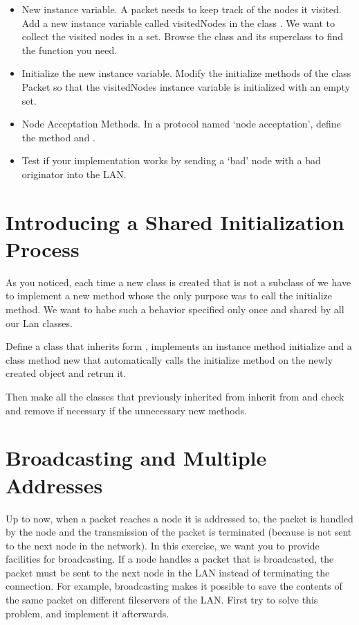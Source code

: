 \begin{itemize}
\item
New instance variable. A packet needs to keep track of the nodes 
it visited. Add a new instance variable called visitedNodes in 
the class . We want to collect the visited nodes in a set. Browse 
the class  and its superclass to find the function you need.\\
\item
Initialize the new instance variable. Modify the initialize methods 
of the class Packet so that the visitedNodes instance variable 
is initialized with an empty set. \\
\item
Node Acceptation Methods. In a protocol named `node acceptation', 
define the method  and . \\
\item
Test if your implementation works by sending a `bad' node with 
a bad originator into the LAN. 
\end{itemize}



\section{Introducing a Shared Initialization Process}


As you noticed, each time a new class is created that is not 
a subclass of  we have to implement a new method whose the 
only purpose was to call the initialize method. We want to habe 
such a behavior specified only once and shared by all our Lan 
classes. 

Define a class  that inherits form , implements 
an instance method initialize and a class method new that automatically 
calls the initialize method on the newly created object and retrun 
it. 

Then make all the classes that previously inherited from  
inherit from  and check and remove if necessary if the 
unnecessary new methods. 



\section{Broadcasting and Multiple Addresses}
Up to now, when a packet reaches a node it is addressed to, the 
packet is handled by the node and the transmission of the packet 
is terminated (because is not sent to the next node in the network). 
In this exercise, we want you to provide facilities for broadcasting. 
If a node handles a packet that is broadcasted, the packet must 
be sent to the next node in the LAN instead of terminating the 
connection. For example, broadcasting makes it possible to save 
the contents of the same packet on different fileservers of the 
LAN. First try to solve this problem, and implement it afterwards.

